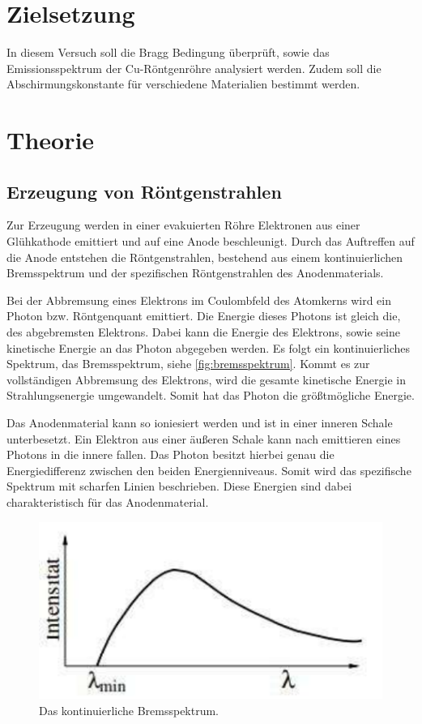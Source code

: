 \section{Zielsetzung}
\label{sec:Zielsetzung}
In diesem Versuch soll die Bragg Bedingung überprüft, sowie das Emissionsspektrum der Cu-Röntgenröhre analysiert werden.
Zudem soll die Abschirmungskonstante für verschiedene Materialien bestimmt werden.

\section{Theorie}
\label{sec:Theorie}

\subsection{Erzeugung von Röntgenstrahlen}
\label{subsec:Erzeugung}

Zur Erzeugung werden in einer evakuierten Röhre Elektronen aus einer Glühkathode emittiert und auf eine Anode beschleunigt.
Durch das Auftreffen auf die Anode entstehen die Röntgenstrahlen, bestehend aus einem kontinuierlichen Bremsspektrum und
der spezifischen Röntgenstrahlen des Anodenmaterials.

\noindent
Bei der Abbremsung eines Elektrons im Coulombfeld des Atomkerns wird ein Photon bzw. Röntgenquant emittiert.
Die Energie dieses Photons ist gleich die, des abgebremsten Elektrons.
Dabei kann die Energie des Elektrons, sowie seine kinetische Energie an das Photon abgegeben werden.
Es folgt ein kontinuierliches Spektrum, das Bremsspektrum, siehe \autoref{fig:bremsspektrum}.
Kommt es zur vollständigen Abbremsung des Elektrons, wird die gesamte kinetische Energie in Strahlungsenergie umgewandelt.
Somit hat das Photon die größtmögliche Energie.

\noindent
Das Anodenmaterial kann so ioniesiert werden und ist in einer inneren Schale unterbesetzt.
Ein Elektron aus einer äußeren Schale kann nach emittieren eines Photons in die innere fallen.
Das Photon besitzt hierbei genau die Energiedifferenz zwischen den beiden Energienniveaus.
Somit wird das spezifische Spektrum mit scharfen Linien beschrieben.
Diese Energien sind dabei charakteristisch für das Anodenmaterial.

\begin{figure}
    \centering
    \includegraphics[width=\textwidth]{content/bremsspektrum.pdf}
    \caption{Das kontinuierliche Bremsspektrum.\cite{anleitung}}
    \label{fig:bremsspektrum}
\end{figure}

